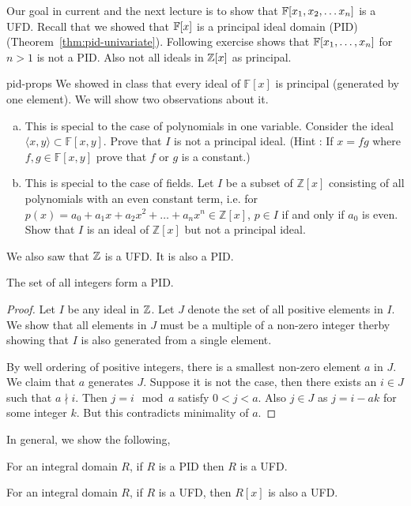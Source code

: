 Our goal in current and the next lecture is to show that ${\mathbb{F}[x_1,x_2, \ldots x_n]}$ is a UFD.
Recall that we showed that ${\mathbb{F}}[x]$ is a principal ideal domain (PID)
(Theorem~\ref{thm:pid-univariate}).  Following exercise shows that
${\mathbb{F}}[x_1,\ldots,x_n]$ for $n > 1$ is not a PID. Also not all ideals in ${\mathbb{Z}}[x]$
as principal.

\begin{exercise-prob}
\begin{show-ps2}{pid-props}
We showed in class that every ideal of $\mathbb{F}[x]$ is principal (generated by one element). We will show two observations about it.
\begin{enumerate}[(a)]
\item This is special to the case of polynomials in one variable. Consider the ideal $\langle x,y \rangle \subset \mathbb{F}[x,y]$. Prove that $I$ is not a principal ideal. (Hint : If $x = fg$ where $f,g \in \mathbb{F}[x,y]$ prove that $f$ or $g$ is a constant.)
\item This is special to the case of fields. Let $I$ be a subset of $\mathbb{Z}[x]$ consisting of all polynomials with an even constant term, i.e. for $p(x) = a_0 + a_1x+a_2x^2+\ldots+a_nx^n \in \mathbb{Z}[x]$, $p \in I$ if and only if $a_0$ is even. Show that $I$ is an ideal of $\mathbb{Z}[x]$ but not a principal ideal.
\end{enumerate}
\end{show-ps2}
\end{exercise-prob}

We also saw that ${\mathbb{Z}}$ is a UFD. It is also a PID. 
\begin{lemma} \label{lem:z-is-pid}
	The set of all integers form a PID.
\end{lemma}
\begin{proof}
	Let $I$ be any ideal in ${\mathbb{Z}}$. Let $J$ denote the set of all positive
	elements in $I$. We show that all elements in $J$ must be a multiple
	of a non-zero integer therby showing that $I$ is also generated from a
	single element. 
	
	By well ordering of positive integers, there is a smallest non-zero
	element $a$ in $J$. We claim that $a$ generates $J$. Suppose it is not
	the case, then there exists an $i \in J$ such that $a \nmid i$. Then $
	j= i \mod a$ satisfy $0 <j <a$. Also $j \in J$ as $j = i -ak$ for some
	integer $k$. But this contradicts minimality of $a$.
\end{proof}

In general, we show the following,
\begin{theorem} \label{thm:pid-is-ufd}
	For an integral domain $R$, if $R$ is a PID then $R$ is a UFD.
\end{theorem}
\begin{theorem} \label{thm:ufd-extn}
	For an integral domain $R$, if $R$ is a UFD, then $R[x]$ is also a
	UFD.
\end{theorem}

